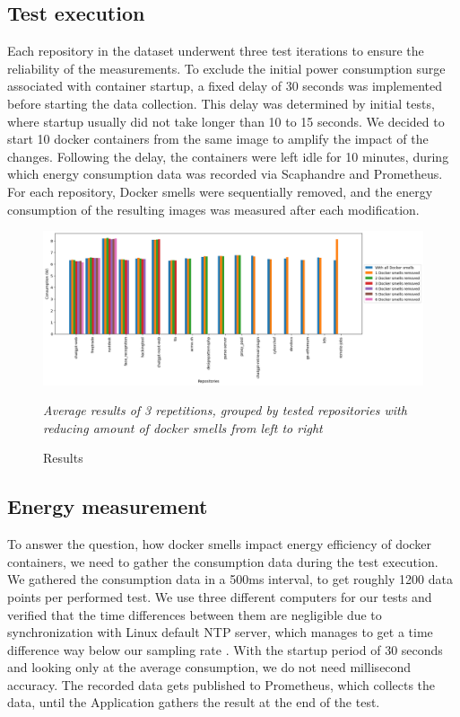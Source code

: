 \documentclass[conference]{IEEEtran}
\begin{document}
\subsection{Test execution}
Each repository in the dataset underwent three test iterations to ensure the reliability of the measurements. To exclude the initial power consumption surge associated with container startup, a fixed delay of 30 seconds was implemented before starting the data collection. This delay was determined by initial tests, where startup usually did not take longer than 10 to 15 seconds. We decided to start 10 docker containers from the same image to amplify the impact of the changes. Following the delay, the containers were left idle for 10 minutes, during which energy consumption data was recorded via Scaphandre and Prometheus. For each repository, Docker smells were sequentially removed, and the energy consumption of the resulting images was measured after each modification.

\begin{figure}[h!]
    \centering
    \includegraphics[width=\linewidth]{graphics/repo_avg_consumption_docker_smell.png}
    \caption{Results}
    \textit{Average results of 3 repetitions, grouped by tested repositories with reducing amount of docker smells from left to right}
    \label{fig:docker_smells}
\end{figure}

\subsection{Energy measurement}
To answer the question, how docker smells impact energy efficiency of docker containers, we need to gather the consumption data during the test execution. We gathered the consumption data in a 500ms interval, to get roughly 1200 data points per performed test. We use three different computers for our tests and verified that the time differences between them are negligible due to synchronization with Linux default NTP server, which manages to get a time difference way below our sampling rate \cite{mills1989accuracy}. With the startup period of 30 seconds and looking only at the average consumption, we do not need millisecond accuracy. The recorded data gets published to Prometheus, which collects the data, until the Application gathers the result at the end of the test. 
\end{document}
